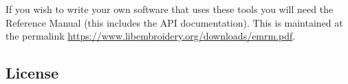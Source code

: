 If you wish to write your own
software that uses these tools you will need the \embname Reference Manual (this
includes the API documentation). This is maintained at the permalink
\url{https://www.libembroidery.org/downloads/emrm.pdf}.

\begin{multicols}{2}
\footnotesize
\section{License}


\end{multicols}

\normalsize





